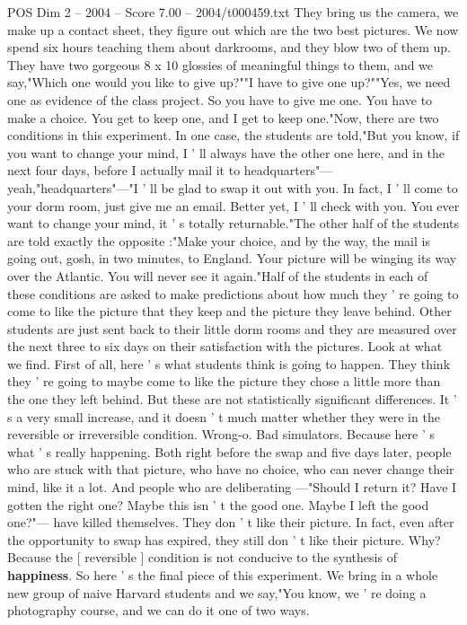 \begin{textsample}{POS Dim 2 – 2004 – Score 7.00 – 2004/t000459.txt}
They bring us the camera, we make up a contact sheet, they figure out which are the two best pictures.
We now spend six hours teaching them about darkrooms, and they blow two of them up.
They have two gorgeous 8 x 10 glossies of meaningful things to them, and we say,"Which one would you like to give up?""I have to give one up?""Yes, we need one as evidence of the class project.
So you have to give me one.
You have to make a choice.
You get to keep one, and I get to keep one."Now, there are two conditions in this experiment.
In one case, the students are told,"But you know, if you want to change your mind, I ' ll always have the other one here, and in the next four days, before I actually mail it to headquarters"— yeah,"headquarters"—"I ' ll be glad to swap it out with you.
In fact, I ' ll come to your dorm room, just give me an email.
Better yet, I ' ll check with you.
You ever want to change your mind, it ' s totally returnable."The other half of the students are told exactly the opposite :"Make your choice, and by the way, the mail is going out, gosh, in two minutes, to England.
Your picture will be winging its way over the Atlantic.
You will never see it again."Half of the students in each of these conditions are asked to make predictions about how much they ' re going to come to like the picture that they keep and the picture they leave behind.
Other students are just sent back to their little dorm rooms and they are measured over the next three to six days on their satisfaction with the pictures.
Look at what we find.
First of all, here ' s what students think is going to happen.
They think they ' re going to maybe come to like the picture they chose a little more than the one they left behind.
But these are not statistically significant differences.
It ' s a very small increase, and it doesn ' t much matter whether they were in the reversible or irreversible condition.
Wrong-o.
Bad simulators.
Because here ' s what ' s really happening.
Both right before the swap and five days later, people who are stuck with that picture, who have no choice, who can never change their mind, like it a lot.
And people who are deliberating —"Should I return it?
Have I gotten the right one?
Maybe this isn ' t the good one.
Maybe I left the good one?"— have killed themselves.
They don ' t like their picture.
In fact, even after the opportunity to swap has expired, they still don ' t like their picture.
Why?
Because the [ reversible ] condition is not conducive to the synthesis of \textbf{happiness}.
So here ' s the final piece of this experiment.
We bring in a whole new group of naive Harvard students and we say,"You know, we ' re doing a photography course, and we can do it one of two ways.

\end{textsample}
